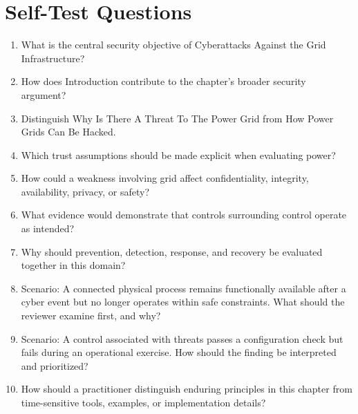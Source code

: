 \documentclass[11pt]{article}
\begin{document}
\section*{Self-Test Questions}
\begin{enumerate}
\item What is the central security objective of Cyberattacks Against the Grid Infrastructure?
\item How does Introduction contribute to the chapter's broader security argument?
\item Distinguish Why Is There A Threat To The Power Grid from How Power Grids Can Be Hacked.
\item Which trust assumptions should be made explicit when evaluating power?
\item How could a weakness involving grid affect confidentiality, integrity, availability, privacy, or safety?
\item What evidence would demonstrate that controls surrounding control operate as intended?
\item Why should prevention, detection, response, and recovery be evaluated together in this domain?
\item Scenario: A connected physical process remains functionally available after a cyber event but no longer operates within safe constraints. What should the reviewer examine first, and why?
\item Scenario: A control associated with threats passes a configuration check but fails during an operational exercise. How should the finding be interpreted and prioritized?
\item How should a practitioner distinguish enduring principles in this chapter from time-sensitive tools, examples, or implementation details?
\end{enumerate}
\end{document}
